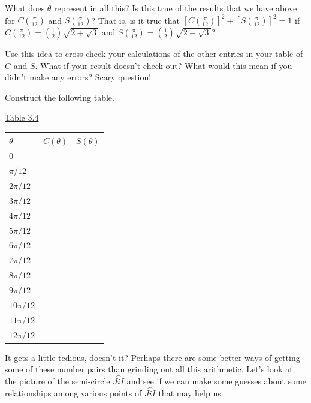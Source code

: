 \documentclass[english]{book}
\newcommand{\arc}[1]{\overset{\frown}{#1} }
\begin{document}
What does $\theta$ represent in all this? Is this true of the results that we have above for $C(\frac{\pi}{12})$ and $S(\frac{\pi}{12})$? That is, is it true that $[C(\frac{\pi}{12})]^{2} + [S(\frac{\pi}{12})]^{2} = 1$ if $C(\frac{\pi}{12}) = (\frac{1}{2}) \sqrt{2+\sqrt{3}}$ and $S(\frac{\pi}{12}) = (\frac{1}{2}) \sqrt{2-\sqrt{3}}$?

\vfill

Use this idea to cross-check your calculations of the other entries in your table of $C$ and $S$. What if your result doesn't check out? What would this mean if you didn't make any errors? Scary question!

\vspace{0.3cm}

\vfill

Construct the following table.

\vspace{4cm}

\begin{center}
\underline{Table 3.4}
\end{center}
\begin{table}[htbp]
\begin{center}
\begin{tabular}{|l|l|l|}
  \hline 
  $\theta$ & $C(\theta)$ & $S(\theta)$ \\
  \hline 
  $0$        & & \\ 
  $\pi/12$   & & \\ 
  $2\pi/12$  & & \\  
  $3\pi/12$  & & \\  
  $4\pi/12$  & & \\  
  $5\pi/12$  & & \\  
  $6\pi/12$  & & \\  
  $7\pi/12$  & & \\  
  $8\pi/12$  & & \\ 
  $9\pi/12$  & & \\ 
  $10\pi/12$ & & \\ 
  $11\pi/12$ & & \\ 
  $12\pi/12$ & & \\ 
  \hline
\end{tabular}
\label{tbl3.4}
\end{center}
\end{table}

\vfill

It gets a little tedious, doesn't it? Perhaps there are some better ways of getting some of these number pairs than grinding out all this arithmetic. Let's look at the picture of the semi-circle $\arc{JiI}$ and see if we can make some guesses about some relationships among various points of $\arc{JiI}$ that may help us.
\end{document}
